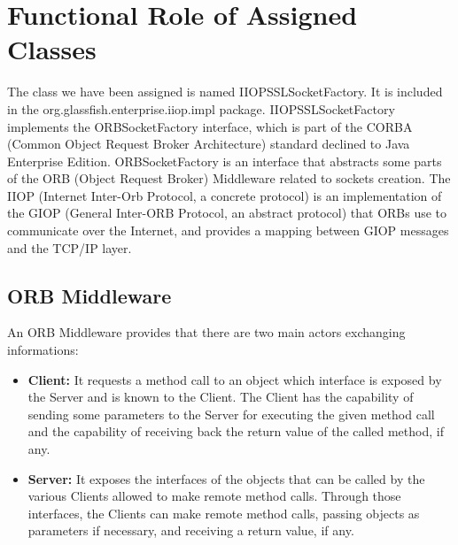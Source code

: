 \section{Functional Role of Assigned Classes}

The class we have been assigned is named IIOPSSLSocketFactory.
It is included in the org.glassfish.enterprise.iiop.impl package.
IIOPSSLSocketFactory implements the ORBSocketFactory interface, which is part of the CORBA (Common Object Request Broker Architecture) standard declined to Java Enterprise Edition.
ORBSocketFactory is an interface that abstracts some parts of the ORB (Object Request Broker) Middleware related to sockets creation.
The IIOP (Internet Inter-Orb Protocol, a concrete protocol) is an implementation of the GIOP (General Inter-ORB Protocol, an abstract protocol) that ORBs use to communicate over the Internet, and provides a mapping between GIOP messages and the TCP/IP layer.

\subsection{ORB Middleware}
An ORB Middleware provides that there are two main actors exchanging informations:
\begin{itemize}
	\item \textbf{Client:}
		It requests a method call to an object which interface is exposed by the Server and is known to the Client.
		The Client has the capability of sending some parameters to the Server for executing the given method call and the capability of receiving back the return value of the called method, if any.
	\item \textbf{Server:}
		It exposes the interfaces of the objects that can be called by the various Clients allowed to make remote method calls.
		Through those interfaces, the Clients can make remote method calls, passing objects as parameters if necessary, and receiving a return value, if any.
\end{itemize}

